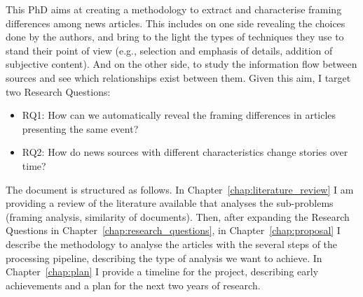 
This PhD aims at creating a methodology to extract and characterise framing differences among news articles.
This includes on one side revealing the choices done by the authors, and bring to the light the types of techniques they use to stand their point of view (e.g., selection and emphasis of details, addition of subjective content).
And on the other side, to study the information flow between sources and see which relationships exist between them. %
Given this aim, I target two Research Questions:

\begin{itemize}
    \item RQ1: How can we automatically reveal the framing differences in articles presenting the same event?
    \item RQ2: How do news sources with different characteristics change stories over time?
\end{itemize}









The document is structured as follows.
In Chapter~\ref{chap:literature_review} I am providing a review of the literature available that analyses the sub-problems (framing analysis, similarity of documents).
Then, after expanding the Research Questions in Chapter~\ref{chap:research_questions}, in Chapter~\ref{chap:proposal} I describe the methodology to analyse the articles with the several steps of the processing pipeline, describing the type of analysis we want to achieve.
In Chapter~\ref{chap:plan} I provide a timeline for the project, describing early achievements and a plan for the next two years of research.


